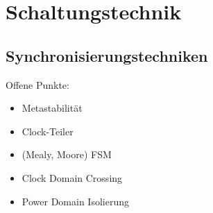 \part{Schaltungstechnik}


\chapter{Synchronisierungstechniken}





Offene Punkte:

\begin{itemize}
    \item{Metastabilität}
    \item{Clock-Teiler}
    \item{(Mealy, Moore) FSM}
    \item{Clock Domain Crossing}
    \item{Power Domain Isolierung}
\end{itemize}

